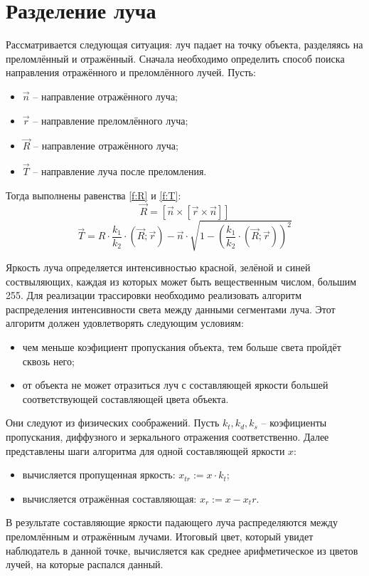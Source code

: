 \section{Разделение луча} {
    Рассматривается следующая ситуация: луч падает на точку объекта,
    разделяясь на преломлённый и отражённый.
    Сначала необходимо определить способ поиска
    направления отражённого и преломлённого лучей.
    Пусть:
    \begin{itemize}
        \item $\vec{n}$ -- направление отражённого луча;
        \item $\vec{r}$ -- направление преломлённого луча;
        \item $\vec{R}$ -- направление отражённого луча;
        \item $\vec{T}$ -- направление луча после преломления.
    \end{itemize}
    Тогда выполнены равенства \ref{f:R} и \ref{f:T}:
    \begin{equation}
        \label{f:R}
        \vec{R} = [\vec{n} \times [\vec{r} \times \vec{n}]]
    \end{equation}
    \begin{equation}
        \label{f:T}
        \vec{T} = R \cdot \frac{k_1}{k_2}
        \cdot (\vec{R}; \vec{r}) - \vec{n} \cdot
        \sqrt{ 1 - (\frac{k_1}{k_2} \cdot (\vec{R}; \vec{r}))^2 }
    \end{equation}
    
    Яркость луча определяется интенсивностью красной, зелёной и синей соствыляющих, каждая из которых может быть
    вещественным числом, большим 255.
    Для реализации трассировки необходимо реализовать алгоритм распределения
    интенсивности света между данными сегментами луча.
    Этот алгоритм должен удовлетворять следующим условиям:
    \begin{itemize}
        \item
            чем меньше коэфициент пропускания объекта,
            тем больше света пройдёт сквозь него;
        \item
            от объекта не может отразиться луч с составляющей яркости
            большей соответствующей составляющей цвета объекта.
    \end{itemize}
    Они следуют из физических соображений.
    Пусть $k_t, k_d, k_s$ -- коэфициенты пропускания,
    диффузного и зеркального отражения соответственно.
    Далее представлены шаги алгоритма для одной составляющей яркости $x$:
    \begin{itemize}
        \item вычисляется пропущенная яркость: $x_{tr} := x \cdot k_t$;
        \item вычисляется отражённая составляющая: $x_r := x - x_tr$.
    \end{itemize}
    В результате составляющие яркости падающего луча распределяются
    между преломлённым и отражённым лучами.
    Итоговый цвет, который увидет наблюдатель в данной точке, вычисляется
    как среднее арифметическое из цветов лучей, на которые распался данный.
}